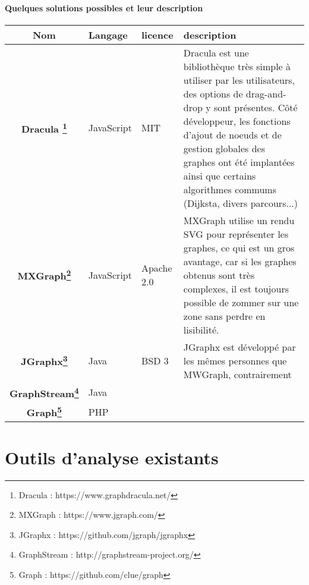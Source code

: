   \paragraph{Quelques solutions possibles et leur description}

  \begin{table}
  	\begin{tabular}{|c|p{2cm}|p{2cm}|p{8cm}|}
	  \hline
	  Nom & Langage & licence & description \\
	  \hline \hline
	  \textbf{Dracula \footnote{Dracula : https://www.graphdracula.net/}} & JavaScript & MIT & Dracula est une bibliothèque très simple à utiliser par les utilisateurs, des options de drag-and-drop y sont présentes. Côté développeur, les fonctions d'ajout de noeuds et de gestion globales des graphes ont été implantées ainsi que certains algorithmes commums (Dijksta, divers parcours...)\\
	  \hline
	  \textbf{MXGraph\footnote{MXGraph : https://www.jgraph.com/}}& JavaScript &  Apache 2.0 & MXGraph utilise un rendu SVG pour représenter les graphes, ce qui est un gros avantage, car si les graphes obtenus sont très complexes, il est toujours possible de zommer sur une zone sans perdre en lisibilité.\\
	  \hline
	  \textbf{JGraphx\footnote{JGraphx : https://github.com/jgraph/jgraphx}}&Java& BSD 3 & JGraphx est développé par les mêmes personnes que MWGraph, contrairement \\
	  \hline 
	  \textbf{GraphStream\footnote{GraphStream : http://graphstream-project.org/}}& Java & & \\
	  \hline
	  \textbf{Graph\footnote{Graph :  https://github.com/clue/graph}}& PHP & & \\
	  \hline
  	\end{tabular}

  \end{table}

  \section{Outils d'analyse existants}

  
  